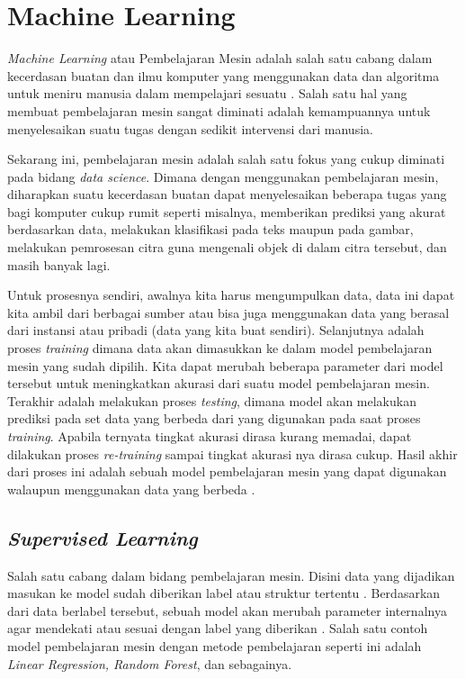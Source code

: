 \section{Machine Learning}

\textit{Machine Learning} atau Pembelajaran Mesin adalah salah satu cabang dalam kecerdasan buatan dan ilmu 
komputer yang menggunakan data dan algoritma untuk meniru manusia dalam mempelajari sesuatu \cite{ibm_ml_expl}. 
Salah satu hal yang membuat pembelajaran mesin sangat diminati adalah kemampuannya untuk menyelesaikan suatu 
tugas dengan sedikit intervensi dari manusia.

Sekarang ini, pembelajaran mesin adalah salah satu fokus yang cukup diminati pada bidang \textit{data science}. 
Dimana dengan menggunakan pembelajaran mesin, diharapkan suatu kecerdasan buatan dapat menyelesaikan beberapa 
tugas yang bagi komputer cukup rumit seperti misalnya, memberikan prediksi yang akurat berdasarkan data, 
melakukan klasifikasi pada teks maupun pada gambar, melakukan pemrosesan citra guna mengenali objek di dalam 
citra tersebut, dan masih banyak lagi.

Untuk prosesnya sendiri, awalnya kita harus mengumpulkan data, data ini dapat kita ambil dari  berbagai sumber 
atau bisa juga menggunakan data yang berasal dari instansi atau pribadi (data yang kita buat sendiri). 
Selanjutnya adalah proses \textit{training} dimana data akan dimasukkan ke dalam model pembelajaran mesin 
yang sudah dipilih. Kita dapat merubah beberapa parameter dari model tersebut untuk meningkatkan akurasi dari 
suatu model pembelajaran mesin. Terakhir adalah melakukan proses \textit{testing}, dimana model akan melakukan 
prediksi pada set data yang berbeda dari yang digunakan pada saat proses \textit{training}. Apabila ternyata 
tingkat akurasi dirasa kurang memadai, dapat dilakukan proses \textit{re-training} sampai tingkat akurasi 
nya dirasa cukup. Hasil akhir dari proses ini adalah sebuah model pembelajaran mesin yang dapat digunakan 
walaupun menggunakan data yang berbeda \cite{mit_ml_expl}.

\subsection{\textit{Supervised Learning}}
Salah satu cabang dalam bidang pembelajaran mesin. Disini data yang dijadikan masukan ke model sudah diberikan 
label atau struktur tertentu \cite{ms_ml_expl}. Berdasarkan dari data berlabel tersebut, sebuah model akan 
merubah parameter internalnya agar mendekati atau sesuai dengan label yang diberikan \cite{ibm_ml_expl}. 
Salah satu contoh model pembelajaran mesin dengan metode pembelajaran seperti ini adalah \textit{Linear 
Regression, Random Forest}, dan sebagainya.

